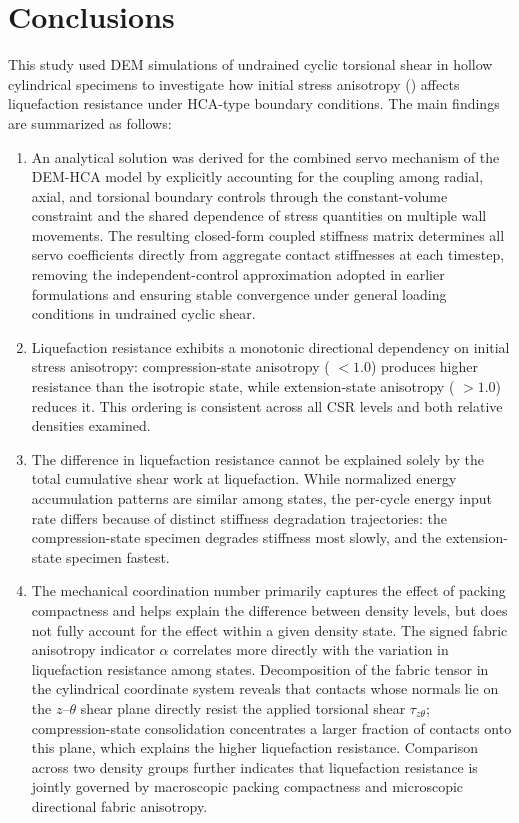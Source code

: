 \section{Conclusions}
\label{sec:conclusions}

This study used DEM simulations of undrained cyclic torsional shear in hollow cylindrical specimens to investigate how initial stress anisotropy (\Kzero{}) affects liquefaction resistance under HCA-type boundary conditions. The main findings are summarized as follows:

\begin{enumerate}
\item An analytical solution was derived for the combined servo mechanism of the DEM-HCA model by explicitly accounting for the coupling among radial, axial, and torsional boundary controls through the constant-volume constraint and the shared dependence of stress quantities on multiple wall movements. The resulting closed-form coupled stiffness matrix determines all servo coefficients directly from aggregate contact stiffnesses at each timestep, removing the independent-control approximation adopted in earlier formulations and ensuring stable convergence under general loading conditions in undrained cyclic shear.

\item Liquefaction resistance exhibits a monotonic directional dependency on initial stress anisotropy: compression-state anisotropy (\Kzero{} $< 1.0$) produces higher resistance than the isotropic state, while extension-state anisotropy (\Kzero{} $> 1.0$) reduces it. This ordering is consistent across all CSR levels and both relative densities examined.

\item The difference in liquefaction resistance cannot be explained solely by the total cumulative shear work at liquefaction. While normalized energy accumulation patterns are similar among \Kzero{} states, the per-cycle energy input rate differs because of distinct stiffness degradation trajectories: the compression-state specimen degrades stiffness most slowly, and the extension-state specimen fastest.

\item The mechanical coordination number \Zm{} primarily captures the effect of packing compactness and helps explain the difference between density levels, but does not fully account for the \Kzero{} effect within a given density state. The signed fabric anisotropy indicator $\alpha$ correlates more directly with the variation in liquefaction resistance among \Kzero{} states. Decomposition of the fabric tensor in the cylindrical coordinate system reveals that contacts whose normals lie on the $z$--$\theta$ shear plane directly resist the applied torsional shear $\tau_{z\theta}$; compression-state consolidation concentrates a larger fraction of contacts onto this plane, which explains the higher liquefaction resistance. Comparison across two density groups further indicates that liquefaction resistance is jointly governed by macroscopic packing compactness and microscopic directional fabric anisotropy.


\end{enumerate}
